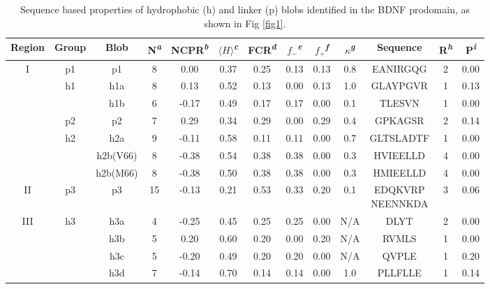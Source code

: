 \documentclass[10pt,letterpaper]{article}
\begin{document}
\begin{table}[!ht]
\begin{adjustwidth}{-2.25in}{0in} %
\centering
\caption{Sequence based properties of hydrophobic (h) and linker (p) blobs identified in the BDNF prodomain, as shown in Fig \ref{fig1}.}
\label{table1}
\begin{tabular}{|c|c|c|c|c|c|c|c|c|c|c|c|c|}
\hline
Region & Group & Blob & N\textsuperscript{\emph{a}} & NCPR\textsuperscript{\emph{b}} & $\langle H \rangle$\textsuperscript{\emph{c}} & FCR\textsuperscript{\emph{d}} & $f_{-}$\textsuperscript{\emph{e}} & $f_{+}$\textsuperscript{\emph{f}} & $\kappa$\textsuperscript{\emph{g}} & Sequence & R\textsuperscript{\emph{h}} & P\textsuperscript{\emph{i}} \\
\hline\hline
\multirow{7}{*}{I} &p1 & p1 & 8 & 0.00 & 0.37 & 0.25 & 0.13 & 0.13 & 0.8 & EANIRGQG & 2 & 0.00\\ 
\hhline{~------------}
 &\multirow{2}{*}{h1}&h1a & 8 & 0.13 & 0.52 & 0.13 & 0.00 & 0.13 & 1.0 & GLAYPGVR & 1 & 0.13\\ \cline{4-13}
\hhline{~~-----------}
& &h1b & 6 & -0.17 & 0.49 & 0.17 & 0.17 & 0.00 & 0.1 & TLESVN & 1 & 0.00\\ 
\hhline{~------------}
& p2&p2 & 7 & 0.29 & 0.34 & 0.29 & 0.00 & 0.29 & 0.4 & GPKAGSR & 2 & 0.14\\
\hhline{~------------}
&\multirow{3}{*}{h2}&h2a & 9 & -0.11 & 0.58 & 0.11 & 0.11 & 0.00 & 0.7 & GLTSLADTF & 1 & 0.00\\
\hhline{~~-----------}
&&h2b(V66) & 8 & -0.38 & 0.54 & 0.38 & 0.38 & 0.00 & 0.3 & HVIEELLD & 4 & 0.00\\
\hhline{~~-----------}
&&h2b(M66) & 8 & -0.38 & 0.50 & 0.38 & 0.38 & 0.00 & 0.3 & HMIEELLD & 4 & 0.00\\
\hhline{-------------}
II&p3&p3 & 15 & -0.13 & 0.21 & 0.53 & 0.33 & 0.20 & 0.1 & \makecell{EDQKVRP \\ NEENNKDA} & 3 & 0.06\\
\hline
\multirow{4}{*}{III}&\multirow{4}{*}{h3}&h3a & 4 & -0.25 & 0.45 & 0.25 & 0.25 & 0.00 & N/A & DLYT & 2 & 0.00\\
\hhline{~~-----------}
&&h3b & 5 & 0.20 & 0.60 & 0.20 & 0.00 & 0.20 & N/A & RVMLS & 1 & 0.00\\
\hhline{~~-----------}
&&h3c & 5 & -0.20 & 0.49 & 0.20 & 0.20 & 0.00 &N/A & QVPLE & 1 & 0.20\\
\hhline{~~-----------}
&&h3d & 7 & -0.14 & 0.70 & 0.14 & 0.14 & 0.00 & 1.0 & PLLFLLE & 1& 0.14\\

\end{tabular}
\end{adjustwidth}
\end{table}
\end{document}
